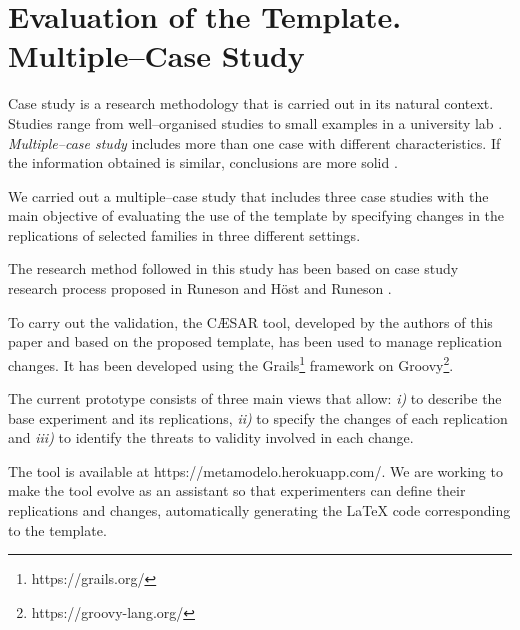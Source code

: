 

\section{Evaluation of the Template. Multiple--Case Study}
\label{sec:Case}

Case study is a research methodology that is carried out in its natural context. Studies range from well--organised studies to small examples in a university lab \cite{runeson2009guidelines,runeson2012case}.
\emph{Multiple--case study} includes more than one case with different characteristics. If the information obtained is similar, conclusions are more solid \cite{runeson2012case}.  

We carried out a multiple--case study that includes three case studies with the main objective of evaluating the use of the template by specifying changes in the replications of selected families in three different settings.

The research method followed in this study has been based on case study research process proposed in Runeson and H{\"o}st \cite{runeson2009guidelines} and Runeson \etal \cite{runeson2012case}. 

To carry out the validation, the CÆSAR tool, developed by the authors of this paper and based on the proposed template, has been used to manage replication changes.
It has been developed using the Grails\footnote{https://grails.org/} framework on Groovy\footnote{https://groovy-lang.org/}.

The current prototype consists of three main views that allow: \emph{i)} to describe the base experiment and its replications, \emph{ii)} to specify the changes of each replication and \emph{iii)} to identify the threats to validity involved in each change.

The tool is available at https://metamodelo.herokuapp.com/. 
We are working to make the tool evolve as an assistant so that experimenters can define their replications and changes, automatically generating the \LaTeX \xspace code corresponding to the template. 


